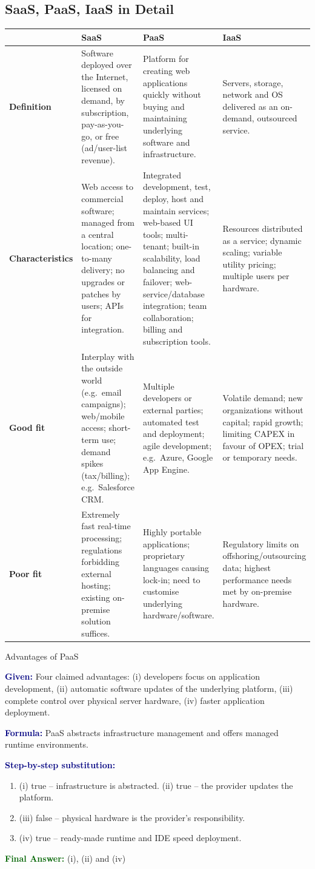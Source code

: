 \documentclass[11pt,a4paper,openany]{report}
\newcommand{\Given}{\par\textbf{\textcolor{navy}{Given:}} }
\newcommand{\Formula}{\par\textbf{\textcolor{navy}{Formula:}} }
\newcommand{\Steps}{\par\textbf{\textcolor{navy}{Step-by-step substitution:}}\par}
\newcommand{\Answer}{\par\textbf{\textcolor{darkgreen}{Final Answer:}} }
\begin{document}
\subsection{SaaS, PaaS, IaaS in Detail}
\begin{center}
\begin{tabularx}{\textwidth}{>{\bfseries}lXXX}
\toprule
 & SaaS & PaaS & IaaS\\
\midrule
Definition & Software deployed over the Internet, licensed on demand, by subscription, pay-as-you-go, or free
(ad/user-list revenue). & Platform for creating web applications quickly without buying and maintaining
underlying software and infrastructure. & Servers, storage, network and OS delivered as an on-demand,
outsourced service.\\
Characteristics & Web access to commercial software; managed from a central location; one-to-many delivery;
no upgrades or patches by users; APIs for integration. & Integrated development, test, deploy, host and
maintain services; web-based UI tools; multi-tenant; built-in scalability, load balancing and failover;
web-service/database integration; team collaboration; billing and subscription tools. & Resources
distributed as a service; dynamic scaling; variable utility pricing; multiple users per hardware.\\
Good fit & Interplay with the outside world (e.g.\ email campaigns); web/mobile access; short-term use;
demand spikes (tax/billing); e.g.\ Salesforce CRM. & Multiple developers or external parties; automated
test and deployment; agile development; e.g.\ Azure, Google App Engine. & Volatile demand; new
organizations without capital; rapid growth; limiting CAPEX in favour of OPEX; trial or temporary needs.\\
Poor fit & Extremely fast real-time processing; regulations forbidding external hosting; existing on-premise
solution suffices. & Highly portable applications; proprietary languages causing lock-in; need to
customise underlying hardware/software. & Regulatory limits on offshoring/outsourcing data; highest
performance needs met by on-premise hardware.\\
\bottomrule
\end{tabularx}
\end{center}

\begin{solved}{Advantages of PaaS}
\Given Four claimed advantages: (i) developers focus on application development, (ii) automatic software
updates of the underlying platform, (iii) complete control over physical server hardware, (iv) faster
application deployment.
\Formula PaaS abstracts infrastructure management and offers managed runtime environments.
\Steps
\begin{enumerate}[leftmargin=*]
  \item (i) true -- infrastructure is abstracted. (ii) true -- the provider updates the platform.
  \item (iii) false -- physical hardware is the provider's responsibility.
  \item (iv) true -- ready-made runtime and IDE speed deployment.
\end{enumerate}
\Answer (i), (ii) and (iv)
\end{solved}
\end{document}
